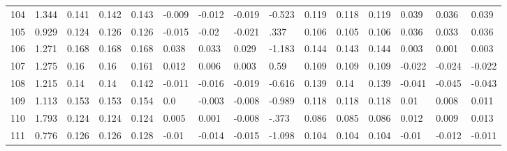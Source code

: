 \begin{table}
\begin{tabular}{|l|l|lll|lll|l|lll|lll}
		104 & 1.344 & 0.141 & 0.142 & 0.143 & -0.009 & -0.012 & -0.019 & -0.523 & 0.119 & 0.118 & 0.119 & 0.039 & 0.036 & 0.039 \\
		105 & 0.929 & 0.124 & 0.126 & 0.126 & -0.015 & -0.02 & -0.021 & .337 & 0.106 & 0.105 & 0.106 & 0.036 & 0.033 & 0.036 \\
		106 & 1.271 & 0.168 & 0.168 & 0.168 & 0.038 & 0.033 & 0.029 & -1.183 & 0.144 & 0.143 & 0.144 & 0.003 & 0.001 & 0.003 \\
		107 & 1.275 & 0.16 & 0.16 & 0.161 & 0.012 & 0.006 & 0.003 & 0.59 & 0.109 & 0.109 & 0.109 & -0.022 & -0.024 & -0.022 \\
		108 & 1.215 & 0.14 & 0.14 & 0.142 & -0.011 & -0.016 & -0.019 & -0.616 & 0.139 & 0.14 & 0.139 & -0.041 & -0.045 & -0.043 \\
		109 & 1.113 & 0.153 & 0.153 & 0.154 & 0.0 & -0.003 & -0.008 & -0.989 & 0.118 & 0.118 & 0.118 & 0.01 & 0.008 & 0.011 \\
		110 & 1.793 & 0.124 & 0.124 & 0.124 & 0.005 & 0.001 & -0.008 & -.373 & 0.086 & 0.085 & 0.086 & 0.012 & 0.009 & 0.013 \\
		111 & 0.776 & 0.126 & 0.126 & 0.128 & -0.01 & -0.014 & -0.015 & -1.098 & 0.104 & 0.104 & 0.104 & -0.01 & -0.012 & -0.011 
	\end{tabular}
	
\end{table}

